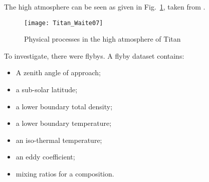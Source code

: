 \hfil%

The high atmosphere can be seen
as given in Fig.~\ref{Titan_high_atm}, taken
from \cite{Waite07}.

\begin{figure}
\centering
\texttt{[image: Titan\_Waite07]}
\caption{\label{Titan_high_atm}Physical processes in the high
atmosphere of Titan}
\end{figure}

To investigate, there were flybys. A flyby dataset contains:
\begin{itemize}
\item A zenith angle of approach;
\item a sub-solar latitude;
\item a lower boundary total density;
\item a lower boundary temperature;
\item an iso-thermal temperature;
\item an eddy coefficient;
\item mixing ratios for a composition.
\end{itemize}
